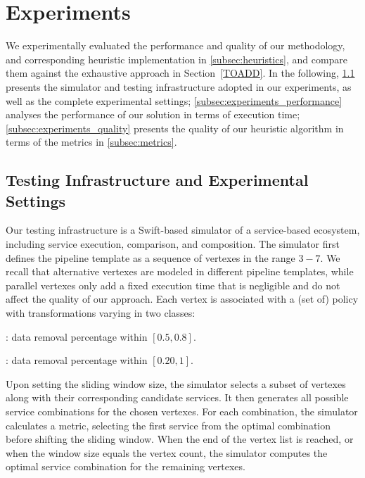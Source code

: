 \section{Experiments}\label{sec:experiment}
We experimentally evaluated the performance and quality of our methodology, and corresponding heuristic implementation in \cref{subsec:heuristics},
and compare them against the exhaustive approach in Section~\cref{TOADD}. In the following,
\cref{subsec:experiments_infrastructure} presents the simulator and testing infrastructure adopted in our experiments, as well as the complete experimental settings; \cref{subsec:experiments_performance} analyses the performance of our solution in terms of execution time; \cref{subsec:experiments_quality} presents the quality of our heuristic algorithm in terms of the metrics in \cref{subsec:metrics}.

\subsection{Testing Infrastructure and Experimental Settings}\label{subsec:experiments_infrastructure}
Our testing infrastructure is a Swift-based simulator of a service-based ecosystem, including service execution, comparison, and composition.
The simulator first defines the pipeline template as a sequence of vertexes in the range $3-7$.
We recall that alternative vertexes are modeled in different pipeline templates,
while parallel vertexes only add a fixed execution time that is negligible and do not affect the quality of our approach.
Each vertex is associated with a (set of) policy with transformations varying in two classes:
\begin{itemize*}
  \item \average: data removal percentage within $[0.5,0.8]$.
  \item \wide:    data removal percentage within $[0.20,1]$.
\end{itemize*}

Upon setting the sliding window size, the simulator selects a subset of vertexes along with their corresponding candidate services.
It then generates all possible service combinations for the chosen vertexes.
For each combination, the simulator calculates a metric, selecting the first service from the optimal combination before shifting the sliding window.
When the end of the vertex list is reached, or when the window size equals the vertex count, the simulator computes the optimal service combination for the remaining vertexes.


